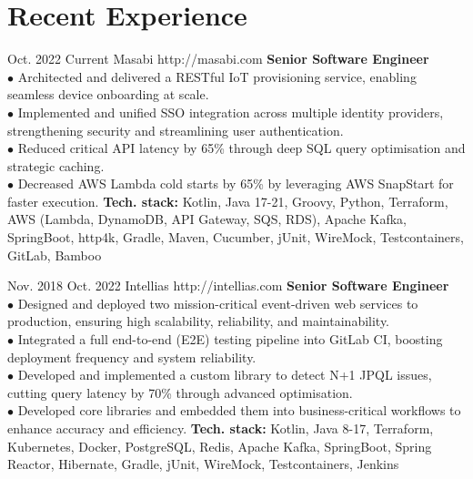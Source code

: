 \documentclass[10pt]{article} %
\begin{document}
\section{Recent Experience}
\job
{Oct. 2022 }{ Current}
{Masabi}
{http://masabi.com}
{\textbf{Senior Software Engineer}}
{
\textbf{}   
\\$\bullet$ Architected and delivered a RESTful IoT provisioning service, enabling seamless device onboarding at scale.
\\$\bullet$ Implemented and unified SSO integration across multiple identity providers, strengthening security and streamlining user authentication.
\\$\bullet$ Reduced critical API latency by 65\% through deep SQL query optimisation and strategic caching.
\\$\bullet$ Decreased AWS Lambda cold starts by 65\% by leveraging AWS SnapStart for faster execution.
\vadjust{\vspace{4pt}}
\newline
\textbf{Tech. stack: }{Kotlin, Java 17-21, Groovy, Python, Terraform, AWS (Lambda, DynamoDB, API Gateway, SQS, RDS), Apache Kafka, SpringBoot, http4k, Gradle, Maven, Cucumber, jUnit, WireMock, Testcontainers, GitLab, Bamboo}   
 }
 
 \job
{Nov. 2018 }{ Oct. 2022}
{Intellias}
{http://intellias.com}
{\textbf{Senior Software Engineer}}
{
\textbf{}   
\\$\bullet$ Designed and deployed two mission-critical event-driven web services to production, ensuring high scalability, reliability, and maintainability.
\\$\bullet$ Integrated a full end-to-end (E2E) testing pipeline into GitLab CI, boosting deployment frequency and system reliability.
\\$\bullet$ Developed and implemented a custom library to detect N+1 JPQL issues, cutting query latency by 70\% through advanced optimisation.
\\$\bullet$ Developed core libraries and embedded them into business-critical workflows to enhance accuracy and efficiency.
\vadjust{\vspace{4pt}}
\newline
\textbf{Tech. stack: }{Kotlin, Java 8-17, Terraform, Kubernetes, Docker, PostgreSQL, Redis, Apache Kafka, SpringBoot, Spring Reactor, Hibernate, Gradle, jUnit, WireMock, Testcontainers, Jenkins}   
 }
\end{document}
